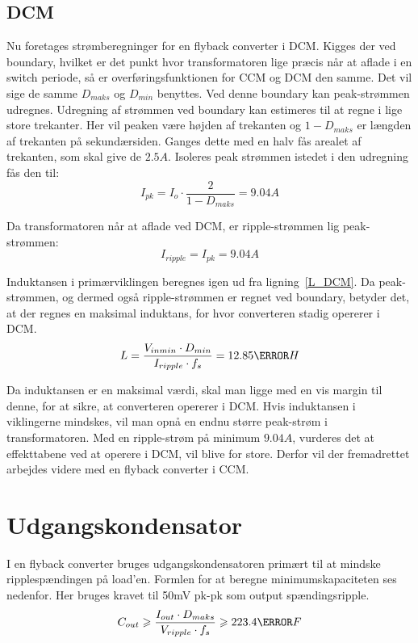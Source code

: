 \subsection{DCM}
Nu foretages strømberegninger for en flyback converter i DCM.
Kigges der ved boundary, hvilket er det punkt hvor transformatoren lige præcis når at aflade i en switch periode, så er overføringsfunktionen for CCM og DCM den samme. Det vil sige de samme $D_{maks}$ og $D_{min}$ benyttes. 
Ved denne boundary kan peak-strømmen udregnes. Udregning af strømmen ved boundary kan estimeres til at regne i lige store trekanter. Her vil peaken være højden af trekanten og $1-D_{maks}$ er længden af trekanten på sekundærsiden. Ganges dette med en halv fås arealet af trekanten, som skal give de $2.5A$. Isoleres peak strømmen istedet i den udregning fås den til:
\begin{equation} \label{DCM_peak_current}
I_{pk} = I_o \cdot \frac{2}{1-D_{maks}} = 9.04A
\end{equation}

\noindent Da transformatoren når at aflade ved DCM, er ripple-strømmen lig peak-strømmen:
\begin{equation} \label{DCM_ripple_current}
I_{ripple} = I_{pk} = 9.04A
\end{equation}

\noindent Induktansen i primærviklingen beregnes igen ud fra ligning~\ref{L_DCM}. Da peak-strømmen, og dermed også ripple-strømmen er regnet ved boundary, betyder det, at der regnes en maksimal induktans, for hvor converteren stadig opererer i DCM.
\begin{equation} \label{L_DCM}
L = \frac{V_{inmin} \cdot D_{min}}{I_{ripple} \cdot f_s} = 12.85\micro H
\end{equation}

\noindent Da induktansen er en maksimal værdi, skal man ligge med en vis margin til denne, for at sikre, at converteren opererer i DCM. Hvis induktansen i viklingerne mindskes, vil man opnå en endnu større peak-strøm i transformatoren. Med en ripple-strøm på minimum $9.04A$, vurderes det at effekttabene ved at operere i DCM, vil blive for store. Derfor vil der fremadrettet arbejdes videre med en flyback converter i CCM.


\section{Udgangskondensator}
I en flyback converter bruges udgangskondensatoren primært til at mindske ripplespændingen på load'en. Formlen for at beregne minimumskapaciteten ses nedenfor. Her bruges kravet til 50mV pk-pk som output spændingsripple\cite{flyback-formler}.
\begin{equation} \label{udgangskondensator}
C_{out} \geqslant \frac{I_{out} \cdot D_{maks}}{V_{ripple} \cdot f_s} \geqslant 223.4 \micro F
\end{equation}

